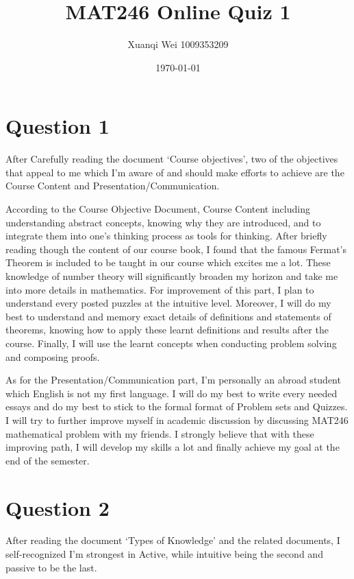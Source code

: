 \documentclass[12pt]{article}
\title{MAT246 Online Quiz 1}
\author{Xuanqi Wei 1009353209}
\date{\today}
\begin{document}
\maketitle
\thispagestyle{empty}

\newpage

\setcounter{page}{1}

\section{Question 1}

After Carefully reading the document `Course objectives', two of the objectives that appeal to me which I'm aware of and should make efforts to achieve are the Course Content and Presentation/Communication.

\noindent According to the Course Objective Document, Course Content including understanding abstract concepts, knowing why they are introduced, and to integrate them into one's thinking process as tools for thinking. After briefly reading though the content of our course book, I found that the famous Fermat’s Theorem is included to be taught in our course which excites me a lot. These knowledge of number theory will significantly broaden my horizon and take me into more details in mathematics. For improvement of this part, I plan to understand every posted puzzles at the intuitive level. Moreover, I will do my best to understand and memory exact details of definitions and statements of theorems, knowing how to apply these learnt definitions and results after the course. Finally, I will use the learnt concepts when conducting problem solving and composing proofs.

\noindent As for the Presentation/Communication part, I’m personally an abroad student which English is not my first language. I will do my best to write every needed essays and do my best to stick to the formal format of Problem sets and Quizzes. I will try to further improve myself in academic discussion by discussing MAT246 mathematical problem with my friends. I strongly believe that with these improving path, I will develop my skills a lot and finally achieve my goal at the end of the semester.

\section{Question 2}

After reading the document `Types of Knowledge' and the related documents, I self-recognized I'm strongest in Active, while intuitive being the second and passive to be the last.
\end{document}
